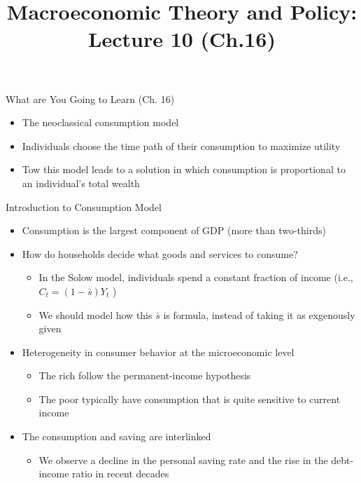 \documentclass[aspectratio=1610]{beamer}
\title[Fall - Lecture 10] %
{Macroeconomic Theory and Policy: Lecture  10 (Ch.16)}
\author[University of Toronto] %
{}
\date[] %
\begin{document}
\begin{frame}
  \titlepage
\end{frame}


\begin{frame}[wide]{What are You Going to Learn (Ch. 16)}
	\begin{itemize}
		\item The neoclassical consumption model
		\item Individuals choose the time path of their consumption to maximize utility
		
		\item Tow this model leads to a solution in which consumption is proportional to an individual’s total wealth
	\end{itemize}
\end{frame}

\begin{frame}[wide]{Introduction to Consumption Model}
	\begin{itemize}
		\item Consumption is the largest component of GDP (more than two-thirds)
		\item How do households decide what goods and services to consume?
		\vspace{1mm}
		\begin{itemize}
			\item In the Solow model, individuals spend a constant fraction of income  (i.e., $C_t = (1-\bar{s})Y_t$ )
			\item We should model how this $\bar{s}$ is formula, instead of taking it as exgenously given
		\end{itemize}
		\item Heterogeneity in consumer behavior at the microeconomic level
		\vspace{1mm}
		\begin{itemize}
			\item The rich follow the permanent-income hypothesis
			\item The poor typically have consumption that is quite sensitive to current income
		\end{itemize}
		\item The consumption and saving are interlinked
		\vspace{1mm}
		\begin{itemize}
			\item We observe a decline in the personal saving rate and the rise in the debt-income ratio in recent decades
		\end{itemize}
	\end{itemize}
\end{frame}
\end{document}
